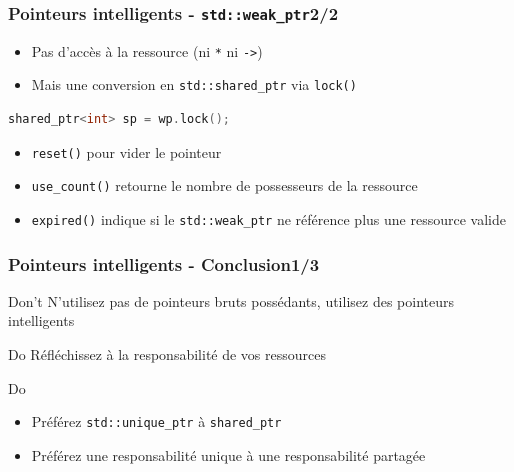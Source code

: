 \documentclass[C++.tex]{subfiles}
\begin{document}
\begin{frame}[fragile]
	\frametitle{Pointeurs intelligents - \lstinline|std::weak_ptr|\titlehfill{}2/2}
	\begin{itemize}
		\item Pas d'accès à la ressource (ni \lstinline|*| ni \lstinline|->|)
		\item Mais une conversion en \lstinline|std::shared_ptr| via \lstinline|lock()|

	\end{itemize}

	\begin{lstlisting}[language=C++]
shared_ptr<int> sp = wp.lock();\end{lstlisting}

	\begin{itemize}
		\item \lstinline|reset()| pour vider le pointeur
		\item \lstinline|use_count()| retourne le nombre de possesseurs de la ressource


		\item \lstinline|expired()| indique si le \lstinline|std::weak_ptr| ne référence plus une ressource valide

	\end{itemize}
\end{frame}

\begin{frame}[fragile]
	\frametitle{Pointeurs intelligents - Conclusion\titlehfill{}1/3}
	\begin{alertblock}{Don't}
		N'utilisez pas de pointeurs bruts possédants, utilisez des pointeurs intelligents
	\end{alertblock}

	\begin{exampleblock}{Do}
		Réfléchissez à la responsabilité de vos ressources
	\end{exampleblock}

	\begin{exampleblock}{Do}
		\begin{itemize}
			\item Préférez \lstinline|std::unique_ptr| à \lstinline|shared_ptr|
			\item Préférez une responsabilité unique à une responsabilité partagée

		\end{itemize}
	\end{exampleblock}
\end{frame}
\end{document}
